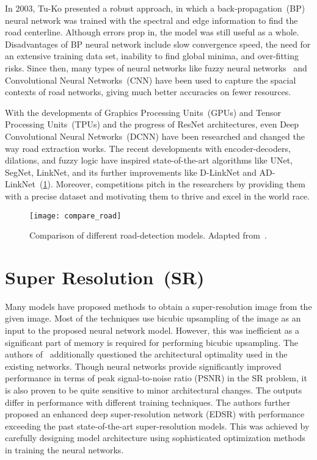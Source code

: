 In 2003, Tu-Ko presented a robust approach, in which a back-propagation~(BP) neural network was trained with the spectral and edge information to find the road centerline. Although errors prop in, the model was still useful as a whole. Disadvantages of BP neural network include slow convergence speed, the need for an extensive training data set, inability to find global minima, and over-fitting risks. Since then, many types of neural networks like fuzzy neural networks~\cite{mokhtarzade2008automatic} and Convolutional Neural Networks~(CNN) have been used to capture the spacial contexts of road networks, giving much better accuracies on fewer resources.

With the developments of Graphics Processing Units~(GPUs) and Tensor Processing Units~(TPUs) and the progress of ResNet architectures, even Deep Convolutional Neural Networks~(DCNN) have been researched and changed the way road extraction works. The recent developments with encoder-decoders, dilations, and fuzzy logic have inspired state-of-the-art algorithms like UNet, SegNet, LinkNet, and its further improvements like D-LinkNet and AD-LinkNet~(\cref{fig:compare_road}). Moreover, competitions pitch in the researchers by providing them with a precise dataset and motivating them to thrive and excel in the world race.

\begin{figure}[h!]
  \centering
  \texttt{[image: compare\_road]}
  \caption[Comparison of different road-detection models]{Comparison of different road-detection models. Adapted from~\cite{AD-LinkNet}.}
  \label{fig:compare_road}
\end{figure}


\section{Super Resolution~(SR)}
Many models have proposed methods to obtain a super-resolution image from the given image. Most of the techniques use bicubic upsampling of the image as an input to the proposed neural network model. However, this was inefficient as a significant part of memory is required for performing bicubic upsampling. The authors of~\cite{EDSR} additionally questioned the architectural optimality used in the existing networks. Though neural networks provide significantly improved performance in terms of peak signal-to-noise ratio (PSNR) in the SR problem, it is also proven to be quite sensitive to minor architectural changes. The outputs differ in performance with different training techniques. The authors further proposed an enhanced deep super-resolution network (EDSR) with performance exceeding the past state-of-the-art super-resolution models. This was achieved by carefully designing model architecture using sophisticated optimization methods in training the neural networks.

